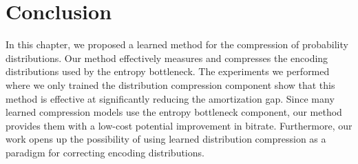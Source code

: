 



%
%

\FloatBarrier




\section{Conclusion}
\label{sec:pdf_compression/conclusion}

In this chapter, we proposed a learned method for the compression of probability distributions.
Our method effectively measures and compresses the encoding distributions used by the entropy bottleneck.
The experiments we performed where we only trained the distribution compression component show that this method is effective at significantly reducing the amortization gap.
Since many learned compression models use the entropy bottleneck component, our method provides them with a low-cost potential improvement in bitrate.
Furthermore, our work opens up the possibility of using learned distribution compression as a paradigm for correcting encoding distributions.



%
%
%
%




